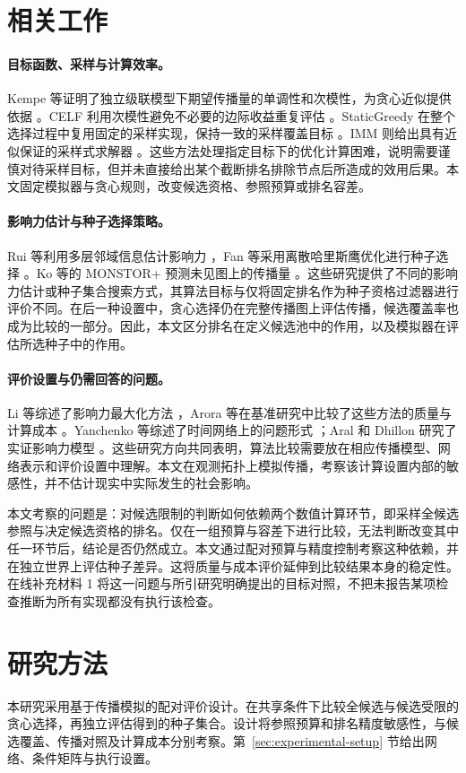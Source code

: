 \documentclass[smallextended]{svjour3}
\begin{document}
\section{相关工作}
\paragraph{目标函数、采样与计算效率。}Kempe 等证明了独立级联模型下期望传播量的单调性和次模性，为贪心近似提供依据 \cite{ref1}。CELF 利用次模性避免不必要的边际收益重复评估 \cite{ref7}。StaticGreedy 在整个选择过程中复用固定的采样实现，保持一致的采样覆盖目标 \cite{ref8}。IMM 则给出具有近似保证的采样式求解器 \cite{ref2}。这些方法处理指定目标下的优化计算困难，说明需要谨慎对待采样目标，但并未直接给出某个截断排名排除节点后所造成的效用后果。本文固定模拟器与贪心规则，改变候选资格、参照预算或排名容差。

\paragraph{影响力估计与种子选择策略。}Rui 等利用多层邻域信息估计影响力 \cite{ref12}，Fan 等采用离散哈里斯鹰优化进行种子选择 \cite{ref13}。Ko 等的 MONSTOR+ 预测未见图上的传播量 \cite{ref19}。这些研究提供了不同的影响力估计或种子集合搜索方式，其算法目标与仅将固定排名作为种子资格过滤器进行评价不同。在后一种设置中，贪心选择仍在完整传播图上评估传播，候选覆盖率也成为比较的一部分。因此，本文区分排名在定义候选池中的作用，以及模拟器在评估所选种子中的作用。

\paragraph{评价设置与仍需回答的问题。}Li 等综述了影响力最大化方法 \cite{ref9}，Arora 等在基准研究中比较了这些方法的质量与计算成本 \cite{ref16}。Yanchenko 等综述了时间网络上的问题形式 \cite{ref11}；Aral 和 Dhillon 研究了实证影响力模型 \cite{ref15}。这些研究方向共同表明，算法比较需要放在相应传播模型、网络表示和评价设置中理解。本文在观测拓扑上模拟传播，考察该计算设置内部的敏感性，并不估计现实中实际发生的社会影响。

本文考察的问题是：对候选限制的判断如何依赖两个数值计算环节，即采样全候选参照与决定候选资格的排名。仅在一组预算与容差下进行比较，无法判断改变其中任一环节后，结论是否仍然成立。本文通过配对预算与精度控制考察这种依赖，并在独立世界上评估种子差异。这将质量与成本评价延伸到比较结果本身的稳定性。在线补充材料 1 将这一问题与所引研究明确提出的目标对照，不把未报告某项检查推断为所有实现都没有执行该检查。

\section{研究方法}
本研究采用基于传播模拟的配对评价设计。在共享条件下比较全候选与候选受限的贪心选择，再独立评估得到的种子集合。设计将参照预算和排名精度敏感性，与候选覆盖、传播对照及计算成本分别考察。第~\ref{sec:experimental-setup} 节给出网络、条件矩阵与执行设置。
\end{document}
